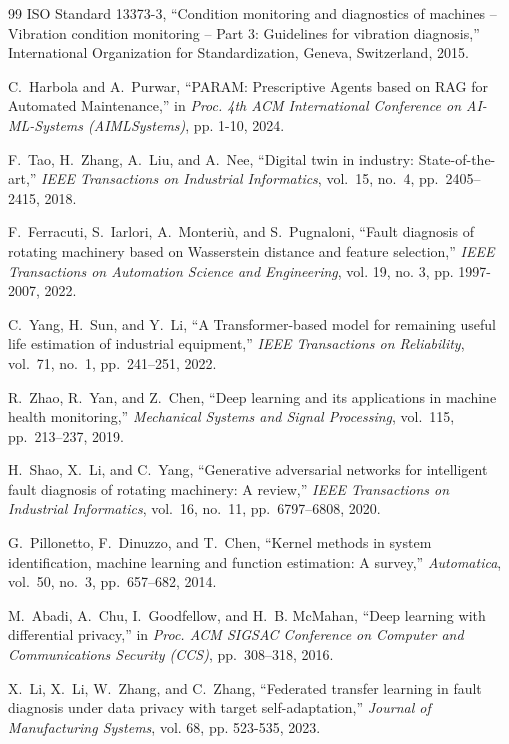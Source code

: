 \documentclass[journal,10pt,compsoc]{IEEEtran}
\begin{document}
\begin{thebibliography}{99}
ISO Standard 13373-3, ``Condition monitoring and diagnostics of machines -- Vibration condition monitoring -- Part 3: Guidelines for vibration diagnosis,'' International Organization for Standardization, Geneva, Switzerland, 2015.

C.~Harbola and A.~Purwar, ``PARAM: Prescriptive Agents based on RAG for Automated Maintenance,'' in \emph{Proc. 4th ACM International Conference on AI-ML-Systems (AIMLSystems)}, pp. 1-10, 2024.

F.~Tao, H.~Zhang, A.~Liu, and A.~Nee, ``Digital twin in industry: State-of-the-art,'' \emph{IEEE Transactions on Industrial Informatics}, vol.~15, no.~4, pp.~2405--2415, 2018.

F.~Ferracuti, S.~Iarlori, A.~Monteriù, and S.~Pugnaloni, ``Fault diagnosis of rotating machinery based on Wasserstein distance and feature selection,'' \emph{IEEE Transactions on Automation Science and Engineering}, vol. 19, no. 3, pp. 1997-2007, 2022.

C.~Yang, H.~Sun, and Y.~Li, ``A Transformer-based model for remaining useful life estimation of industrial equipment,'' \emph{IEEE Transactions on Reliability}, vol.~71, no.~1, pp.~241--251, 2022.

R.~Zhao, R.~Yan, and Z.~Chen, ``Deep learning and its applications in machine health monitoring,'' \emph{Mechanical Systems and Signal Processing}, vol.~115, pp.~213--237, 2019.

H.~Shao, X.~Li, and C.~Yang, ``Generative adversarial networks for intelligent fault diagnosis of rotating machinery: A review,'' \emph{IEEE Transactions on Industrial Informatics}, vol.~16, no.~11, pp.~6797--6808, 2020.

G.~Pillonetto, F.~Dinuzzo, and T.~Chen, ``Kernel methods in system identification, machine learning and function estimation: A survey,'' \emph{Automatica}, vol.~50, no.~3, pp.~657--682, 2014.

M.~Abadi, A.~Chu, I.~Goodfellow, and H.~B. McMahan, ``Deep learning with differential privacy,'' in \emph{Proc. ACM SIGSAC Conference on Computer and Communications Security (CCS)}, pp.~308--318, 2016.

X.~Li, X.~Li, W.~Zhang, and C.~Zhang, ``Federated transfer learning in fault diagnosis under data privacy with target self-adaptation,'' \emph{Journal of Manufacturing Systems}, vol. 68, pp. 523-535, 2023.


\end{thebibliography}
\end{document}

